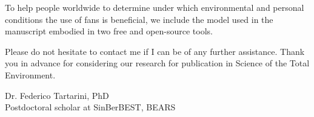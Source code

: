 \documentclass[11pt,a4paper,roman]{moderncv}        %
\begin{document}
To help people worldwide to determine under which environmental and personal conditions the use of fans is beneficial, we include the model used in the manuscript embodied in two free and open-source tools.

Please do not hesitate to contact me if I can be of any further assistance. Thank you in advance for considering our research for publication in Science of the Total Environment.

\bigskip

Dr. Federico Tartarini, PhD\\
Postdoctoral scholar at SinBerBEST, BEARS
\end{document}
